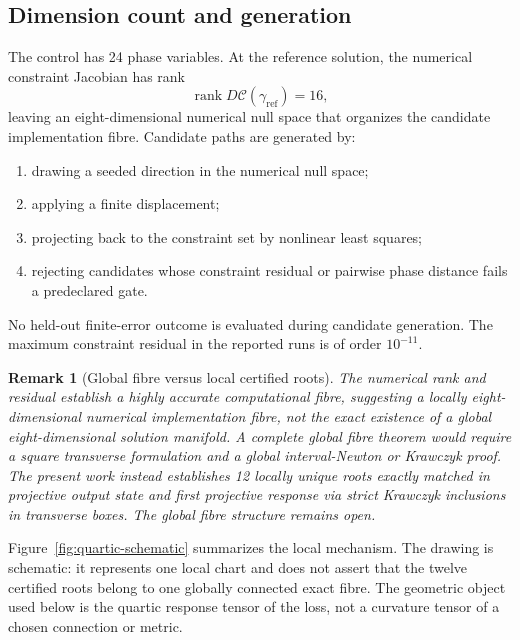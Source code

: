 \documentclass[11pt]{article}
\newtheorem{remark}{Remark}
\newcommand{\rank}{\operatorname{rank}}
\newcommand{\cC}{\mathcal{C}}
\begin{document}
\subsection{Dimension count and generation}

The control has 24 phase variables. At the reference solution, the numerical constraint Jacobian has rank
\[
\rank D\cC(\gamma_{\mathrm{ref}})=16,
\]
leaving an eight-dimensional numerical null space that organizes the candidate implementation fibre. Candidate paths are generated by:
\begin{enumerate}[leftmargin=2.2em]
\item drawing a seeded direction in the numerical null space;
\item applying a finite displacement;
\item projecting back to the constraint set by nonlinear least squares;
\item rejecting candidates whose constraint residual or pairwise phase distance fails a predeclared gate.
\end{enumerate}
No held-out finite-error outcome is evaluated during candidate generation. The maximum constraint residual in the reported runs is of order $10^{-11}$.

\begin{remark}[Global fibre versus local certified roots]
The numerical rank and residual establish a highly accurate computational fibre, suggesting a locally eight-dimensional numerical implementation fibre, not the exact existence of a global eight-dimensional solution manifold. A complete global fibre theorem would require a square transverse formulation and a global interval-Newton or Krawczyk proof. The present work instead establishes 12 locally unique roots exactly matched in projective output state and first projective response via strict Krawczyk inclusions in transverse boxes. The global fibre structure remains open.
\end{remark}


Figure~\ref{fig:quartic-schematic} summarizes the local mechanism. The
drawing is schematic: it represents one local chart and does not assert that
the twelve certified roots belong to one globally connected exact fibre.
The geometric object used below is the quartic response tensor of the loss,
not a curvature tensor of a chosen connection or metric.
\end{document}
